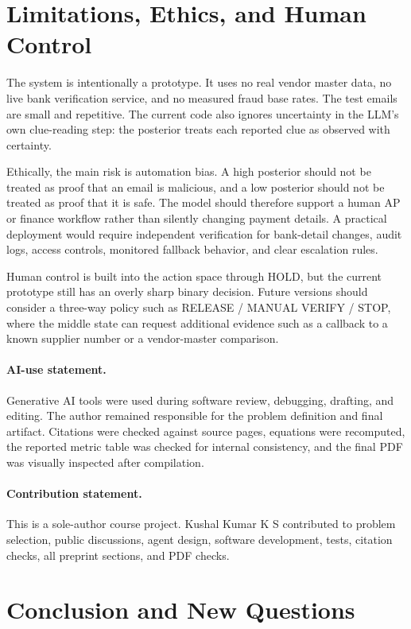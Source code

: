 \documentclass{article}
\begin{document}
\section{Limitations, Ethics, and Human Control}

The system is intentionally a prototype. It uses no real vendor master data, no live bank verification service, and no measured fraud base rates. The test emails are small and repetitive. The current code also ignores uncertainty in the LLM's own clue-reading step: the posterior treats each reported clue as observed with certainty.

Ethically, the main risk is automation bias. A high posterior should not be treated as proof that an email is malicious, and a low posterior should not be treated as proof that it is safe. The model should therefore support a human AP or finance workflow rather than silently changing payment details. A practical deployment would require independent verification for bank-detail changes, audit logs, access controls, monitored fallback behavior, and clear escalation rules.

Human control is built into the action space through HOLD, but the current prototype still has an overly sharp binary decision. Future versions should consider a three-way policy such as RELEASE / MANUAL VERIFY / STOP, where the middle state can request additional evidence such as a callback to a known supplier number or a vendor-master comparison.

\paragraph{AI-use statement.}
Generative AI tools were used during software review, debugging, drafting, and editing. The author remained responsible for the problem definition and final artifact. Citations were checked against source pages, equations were recomputed, the reported metric table was checked for internal consistency, and the final PDF was visually inspected after compilation.

\paragraph{Contribution statement.}
This is a sole-author course project. Kushal Kumar K S contributed to problem selection, public discussions, agent design, software development, tests, citation checks, all preprint sections, and PDF checks.

\section{Conclusion and New Questions}
\end{document}
